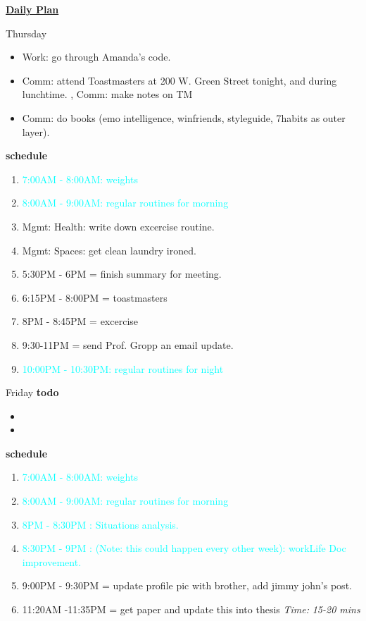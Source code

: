 \documentclass[serif,mathserif,final]{beamer}
\newcommand{\timeEst}[1]{\textit{Time:} \textit{#1}}
\newcommand{\regItem}[1]{\item \textcolor{cyan}{#1}}
\begin{document}
\begin{frame}{}
\begin{columns}[t]
\begin{column}{0.33\linewidth}{\textbf{\underline{Daily Plan}}}
{\begin{block}{\small Thursday}
\begin{itemize}
\item \tiny Work: go through Amanda's code.  

\item \tiny Comm: attend Toastmasters at 200 W. Green Street tonight, and during lunchtime. , Comm: make notes on TM 

\item \tiny Comm: do books (emo intelligence, winfriends, styleguide, 7habits as outer layer). 

\end{itemize} 

\textbf{schedule} \\
  \begin{enumerate} 
    \regItem{7:00AM - 8:00AM: weights}
    \regItem{8:00AM - 9:00AM: regular routines for morning}
  \item \tiny Mgmt: Health: write down excercise routine.  
  \item \tiny Mgmt: Spaces: get clean laundry ironed.     
  \item \tiny 5:30PM - 6PM = finish summary for meeting.  
  \item \tiny 6:15PM - 8:00PM = toastmasters 
  \item \tiny 8PM - 8:45PM = excercise     
  \item \tiny 9:30-11PM = send Prof. Gropp an email update. 
    \regItem{10:00PM - 10:30PM: regular routines for night}
  \end{enumerate}
\end{block}

\begin{block}{\small Friday} 
  \textbf{todo} 
  \begin{itemize} 
  \item \tiny 
  \item \tiny
  \end{itemize} 
  \textbf{schedule}
\begin{enumerate}   
  \regItem{\tiny 7:00AM - 8:00AM: weights}
  \regItem{\tiny 8:00AM - 9:00AM: regular routines for morning}
  \regItem{\tiny 8PM - 8:30PM : Situations analysis.} 
  \regItem{\tiny 8:30PM - 9PM : (Note: this could happen every other week):  workLife Doc improvement. } 
  \tiny \item \tiny 9:00PM - 9:30PM  =  update profile pic with brother, add jimmy john's post.  
   \item \tiny 11:20AM -11:35PM = get paper and update this into thesis \timeEst{15-20 mins} 
     

\end{enumerate}
\end{block}}
\end{column}
\end{columns}
\end{frame}
\end{document}
